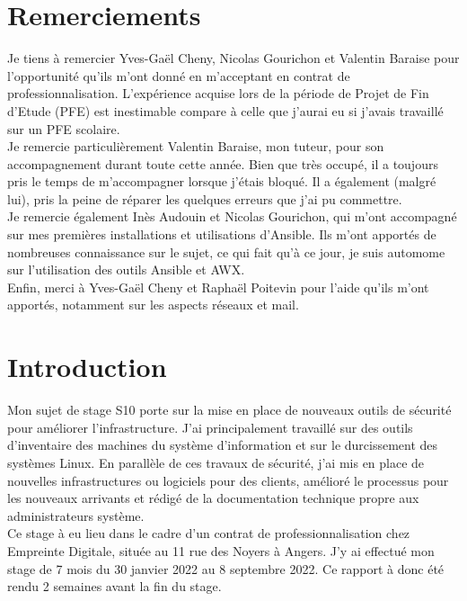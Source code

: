 \documentclass[12pt]{article}
\begin{document}
\newpage
\section*{Remerciements}
Je tiens à remercier Yves-Gaël Cheny, Nicolas Gourichon et Valentin Baraise pour l'opportunité qu'ils m'ont donné en m'acceptant en contrat de professionnalisation. 
L'expérience acquise lors de la période de Projet de Fin d'Etude (PFE) est inestimable compare à celle que j'aurai eu si j'avais travaillé sur un PFE scolaire. \\

Je remercie particulièrement Valentin Baraise, mon tuteur, pour son accompagnement durant toute cette année. 
Bien que très occupé, il a toujours pris le temps de m'accompagner lorsque j'étais bloqué. 
Il a également (malgré lui), pris la peine de réparer les quelques erreurs que j'ai pu commettre. \\

Je remercie également Inès Audouin et Nicolas Gourichon, qui m'ont accompagné sur mes premières installations et utilisations d'Ansible. 
Ils m'ont apportés de nombreuses connaissance sur le sujet, ce qui fait qu'à ce jour, je suis automome sur l'utilisation des outils Ansible et AWX. \\

Enfin, merci à Yves-Gaël Cheny et Raphaël Poitevin pour l'aide qu'ils m'ont apportés, notamment sur les aspects réseaux et mail.


\newpage
\tableofcontents

\newpage
\section*{Introduction}
Mon sujet de stage S10 porte sur la mise en place de nouveaux outils de sécurité pour améliorer l'infrastructure. 
J'ai principalement travaillé sur des outils d'inventaire des machines du système d'information et sur le durcissement des systèmes Linux. 
En parallèle de ces travaux de sécurité, j'ai mis en place de nouvelles infrastructures ou logiciels pour des clients, amélioré le processus pour les nouveaux arrivants et rédigé de la documentation technique propre aux administrateurs système. \\

Ce stage à eu lieu dans le cadre d'un contrat de professionnalisation chez Empreinte Digitale, située au 11 rue des Noyers à Angers. 
J'y ai effectué mon stage de 7 mois du 30 janvier 2022 au 8 septembre 2022. 
Ce rapport à donc été rendu 2 semaines avant la fin du stage. \\
\end{document}
